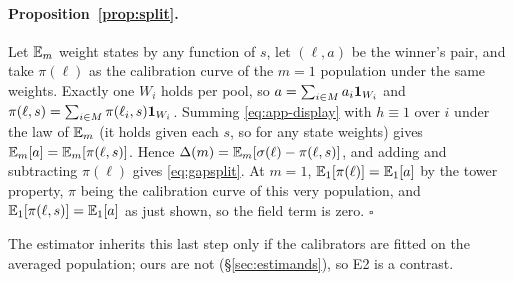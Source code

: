 \paragraph{Proposition~\ref{prop:split}.}
Let $\mathbb{E}_m$ weight states by any function of $s$, let $(\ell,a)$ be the winner's pair, and take
$\pi(\ell)$ as the calibration curve of the $m=1$ population under the same weights. Exactly one
$W_i$ holds per pool, so $a=\sum_{i\in M}a_i\mathbf{1}_{W_i}$ and
$\pi(\ell,s)=\sum_{i\in M}\pi(\ell_i,s)\mathbf{1}_{W_i}$. Summing \eqref{eq:app-display} with
$h\equiv1$ over $i$ under the law of $\mathbb{E}_m$ (it holds given each $s$, so for any state
weights) gives $\mathbb{E}_m[a]=\mathbb{E}_m[\pi(\ell,s)]$. Hence
$\Delta(m)=\mathbb{E}_m[\sigma(\ell)-\pi(\ell,s)]$, and adding and subtracting $\pi(\ell)$ gives
\eqref{eq:gapsplit}. At $m=1$, $\mathbb{E}_1[\pi(\ell)]=\mathbb{E}_1[a]$ by the tower property, $\pi$ being the
calibration curve of this very population, and $\mathbb{E}_1[\pi(\ell,s)]=\mathbb{E}_1[a]$ as just shown, so
the field term is zero. \hfill$\square$

The estimator inherits this last step only if the calibrators are fitted on the averaged population;
ours are not (\S\ref{sec:estimands}), so E2 is a contrast.
